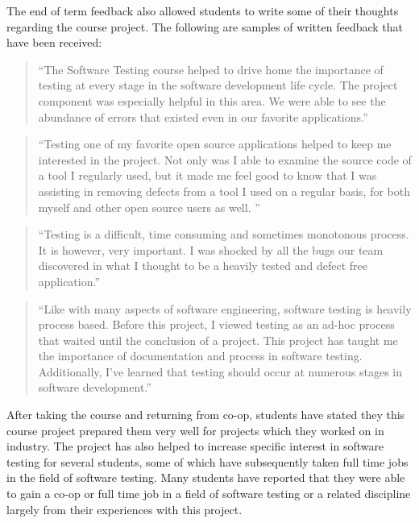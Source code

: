 \documentclass{sig-alternate}
\begin{document}
The end of term feedback also allowed students to write some of their thoughts regarding the course project. The following are samples of written feedback that have been received:

\begin{quotation}
``The Software Testing course helped to drive home the importance of testing at every stage in the software development life cycle. The project component was especially helpful in this area. We were able to see the abundance of errors that existed even in our favorite applications.''
\end{quotation}

\begin{quotation}
``Testing one of my favorite open source applications helped to keep me interested in the project. Not only was I able to examine the source code of a tool I regularly used, but it made me feel good to know that I was assisting in removing defects from a tool I used on a regular basis, for both myself and other open source users as well. ''
\end{quotation}

\begin{quotation}
``Testing is a difficult, time consuming and sometimes monotonous process. It is however, very important. I was shocked by all the bugs our team discovered in what I thought to be a heavily tested and defect free application.''
\end{quotation}

\begin{quotation}
``Like with many aspects of software engineering, software testing is heavily process based. Before this project, I viewed testing as an ad-hoc process that waited until the conclusion of a project. This project has taught me the importance of documentation and process in software testing. Additionally, I've learned that testing should occur at numerous stages in software development.''
\end{quotation}

After taking the course and returning from co-op, students have stated they this course project prepared them very well for projects which they worked on in industry. The project has also helped to increase specific interest in software testing for several students, some of which have subsequently taken full time jobs in the field of software testing. Many students have reported that they were able to gain a co-op or full time job in a field of software testing or a related discipline largely from their experiences with this project.
\end{document}
